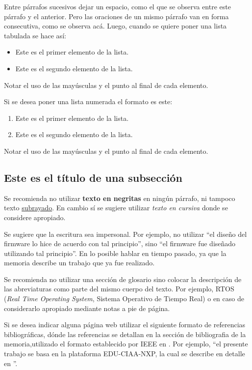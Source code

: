 Entre párrafos sucesivos dejar un espacio, como el que se observa entre este párrafo y el anterior. Pero las oraciones de un mismo párrafo van en forma consecutiva, como se observa acá. Luego, cuando se quiere poner una lista tabulada se hace así:

\begin{itemize}
	\item Este es el primer elemento de la lista.
	\item Este es el segundo elemento de la lista.
\end{itemize}

Notar el uso de las mayúsculas y el punto al final de cada elemento.

Si se desea poner una lista numerada el formato es este:

\begin{enumerate}
	\item Este es el primer elemento de la lista.
	\item Este es el segundo elemento de la lista.
\end{enumerate}

Notar el uso de las mayúsculas y el punto al final de cada elemento.

\subsection{Este es el título de una subsección}
\label{subsec:ejemplo}

Se recomienda no utilizar \textbf{texto en negritas} en ningún párrafo, ni tampoco texto \underline{subrayado}. En cambio sí se sugiere utilizar \textit{texto en cursiva} donde se considere apropiado.

Se sugiere que la escritura sea impersonal. Por ejemplo, no utilizar ``el diseño del firmware lo hice de acuerdo con tal principio'', sino ``el firmware fue diseñado utilizando tal principio''. En lo posible hablar en tiempo pasado, ya que la memoria describe un trabajo que ya fue realizado.

Se recomienda no utilizar una sección de glosario sino colocar la descripción de las abreviaturas como parte del mismo cuerpo del texto. Por ejemplo, RTOS (\textit{Real Time Operating System}, Sistema Operativo de Tiempo Real) o en caso de considerarlo apropiado mediante notas a pie de página.

Si se desea indicar alguna página web utilizar el siguiente formato de referencias bibliográficas, dónde las referencias se detallan en la sección de bibliografia de la memoria,utilizado el formato establecido por IEEE en \citep{IEEE:citation}. Por ejemplo, ``el presente trabajo se basa en la plataforma EDU-CIAA-NXP, la cual se describe en detalle en \citep{CIAA}''.

